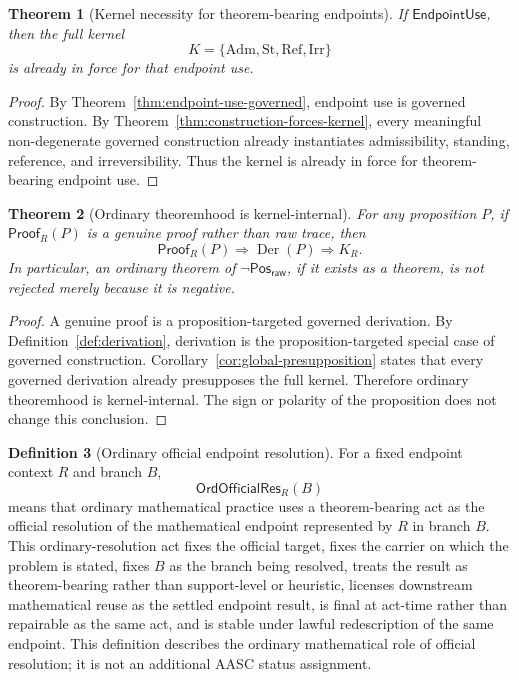 \documentclass[11pt]{article}
\newtheorem{theorem}{Theorem}[section]
\theoremstyle{definition}
\newtheorem{definition}[theorem]{Definition}
\theoremstyle{remark}
\newcommand{\PosRaw}{\mathsf{Pos}_{\mathsf{raw}}}
\newcommand{\ProofR}{\mathsf{Proof}_{R}}
\newcommand{\Der}{\operatorname{Der}}
\newcommand{\Adm}{\mathrm{Adm}}
\newcommand{\St}{\mathrm{St}}
\newcommand{\RefK}{\mathrm{Ref}}
\newcommand{\Irr}{\mathrm{Irr}}
\newcommand{\EndpointUse}{\mathsf{EndpointUse}}
\newcommand{\OrdOfficialRes}{\mathsf{OrdOfficialRes}}
\begin{document}
\begin{theorem}[Kernel necessity for theorem-bearing endpoints]\label{thm:kernel-necessity}
If \(\EndpointUse\), then the full kernel
\[
  K=\{\Adm,\St,\RefK,\Irr\}
\]
is already in force for that endpoint use.
\end{theorem}

\begin{proof}
By Theorem~\ref{thm:endpoint-use-governed}, endpoint use is governed construction. By Theorem~\ref{thm:construction-forces-kernel}, every meaningful non-degenerate governed construction already instantiates admissibility, standing, reference, and irreversibility. Thus the kernel is already in force for theorem-bearing endpoint use.
\end{proof}

\begin{theorem}[Ordinary theoremhood is kernel-internal]\label{thm:ordinary-theoremhood-kernel-internal}
For any proposition \(P\), if \(\ProofR(P)\) is a genuine proof rather than raw trace, then
\[
  \ProofR(P)\Rightarrow \Der(P)\Rightarrow K_R.
\]
In particular, an ordinary theorem of \(\neg\PosRaw\), if it exists as a theorem, is not rejected merely because it is negative.
\end{theorem}

\begin{proof}
A genuine proof is a proposition-targeted governed derivation. By Definition~\ref{def:derivation}, derivation is the proposition-targeted special case of governed construction. Corollary~\ref{cor:global-presupposition} states that every governed derivation already presupposes the full kernel. Therefore ordinary theoremhood is kernel-internal. The sign or polarity of the proposition does not change this conclusion.
\end{proof}

\begin{definition}[Ordinary official endpoint resolution]\label{def:ordinary-official-endpoint-resolution}
For a fixed endpoint context \(R\) and branch \(B\),
\[
  \OrdOfficialRes_R(B)
\]
means that ordinary mathematical practice uses a theorem-bearing act as the official resolution of the mathematical endpoint represented by \(R\) in branch \(B\). This ordinary-resolution act fixes the official target, fixes the carrier on which the problem is stated, fixes \(B\) as the branch being resolved, treats the result as theorem-bearing rather than support-level or heuristic, licenses downstream mathematical reuse as the settled endpoint result, is final at act-time rather than repairable as the same act, and is stable under lawful redescription of the same endpoint. This definition describes the ordinary mathematical role of official resolution; it is not an additional AASC status assignment.
\end{definition}
\end{document}
